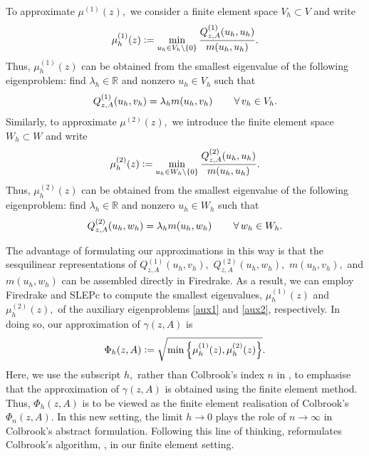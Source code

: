  To approximate $\mu^{(1)}(z),$ we consider a finite element space $V_h \subset V$ and write 
\begin{equation}
    \mu_h^{(1)}(z) \vcentcolon= \min_{u_h \in V_h\setminus\{0\}} \frac{Q_{z, A}^{(1)}(u_h, u_h)}{m(u_h, u_h)}.
\end{equation}
Thus, $\mu_h^{(1)}(z)$ can be obtained from the smallest eigenvalue of the following eigenproblem: find $\lambda_h \in \mathbb{R}$ and nonzero $u_h \in V_h$ such that 
\begin{equation} \label{aux1}
    Q_{z, A}^{(1)}(u_h, v_h) = \lambda_h m(u_h, v_h) \qquad \operatorname{\forall} v_h \in V_h.
\end{equation}
Similarly, to approximate $\mu^{(2)}(z),$ we introduce the finite element space $W_h \subset W$ and write
\begin{equation}
    \mu_h^{(2)}(z) \vcentcolon= \min_{u_h \in W_h\setminus\{0\}} \frac{Q_{z, A}^{(2)}(u_h, u_h)}{m(u_h, u_h)}.
\end{equation} 
Thus, $\mu_h^{(2)}(z)$ can be obtained from the smallest eigenvalue of the following eigenproblem: find $\lambda_h \in \mathbb{R}$ and nonzero $u_h \in W_h$ such that 
\begin{equation} \label{aux2}
    Q_{z, A}^{(2)}(u_h, w_h) = \lambda_h m(u_h, w_h) \qquad \operatorname{\forall} w_h \in W_h.
\end{equation}

The advantage of formulating our approximations in this way is that the sesquilinear representations of 
$Q_{z, A}^{(1)}(u_h, v_h),$  $Q_{z, A}^{(2)}(u_h, w_h),$ $m(u_h, v_h),$ and $m(u_h, w_h)$ can be assembled directly in Firedrake. As a result, we can employ Firedrake and SLEPc to compute the smallest eigenvalues, $\mu_h^{(1)}(z)$ and $\mu_h^{(2)}(z),$ of the auxiliary eigenproblems \eqref{aux1} and \eqref{aux2}, respectively. In doing so, our approximation of $\gamma(z, A)$ is
\begin{equation} \label{approx phi}
    \Phi_h(z, A) \vcentcolon= \sqrt{ \min \left\{ \mu_h^{(1)}(z), \mu_h^{(2)}(z) \right\} }.
\end{equation}
Here, we use the subscript $h,$ rather than Colbrook's index $n$ in , to emphasise that the approximation of $\gamma(z, A)$ is obtained using the finite element method. Thus, $\Phi_h(z, A)$ is to be viewed as the finite element realisation of Colbrook's $\Phi_n(z, A).$ In this new setting, the limit $h \rightarrow 0$ plays the role of $n \rightarrow \infty$ in Colbrook's abstract formulation.
Following this line of thinking,  reformulates Colbrook's algorithm, , in our finite element setting.

